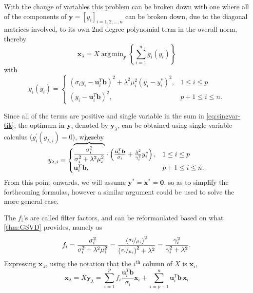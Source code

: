 \documentclass{article}
\newcommand{\mbf}[1]{\mathbf{#1}}
\DeclareMathOperator*{\argmin}{arg\,min} %
\begin{document}
	With the change of variables this problem can be broken down with one where all of the components of $\textbf{y} = \left[y_i\right]_{i=1,2,\dots,n}$ can be broken down, due to the diagonal matrices involved, to its own 2nd degree polynomial term in the overall norm, thereby
	\begin{equation}\label{eq:singvar-tik}
		\textbf{x}_{\lambda} = X \argmin_{\mbf{y}} \left\lbrace \sum_{i=1}^{n} g_i (y_i) \right\rbrace 
	\end{equation}
	with 
	\begin{equation}
		g_i (y_i) = \begin{cases}
			\left(\sigma_i y_i - \textbf{u}_i^T \textbf{b} \right)^2 + \lambda^2 \mu^2_i \left(y_i-y_i^\ast\right)^2, & 1 \leq i \leq p\\
			\left(y_i-\textbf{u}_i^T \textbf{b} \right)^2, & p+1 \leq i \leq n.
		\end{cases}
	\end{equation}
	
	Since all of the terms are positive and single variable in the sum in \autoref{eq:singvar-tik}, the optimum in $\textbf{y}$, denoted by ${\textbf{y}}_\lambda$, can be obtained using single variable calculus ($g_i^\prime({y}_{\lambda, i}) = 0$), whereby
	\vspace{0.2cm}
	\begin{equation}
		{y}_{\lambda,i} = \begin{cases}
			{\smash[t]{\overbrace{\frac{\sigma_i^2}{\sigma_i^2 + \lambda^2 \mu_i^2}}^{f_i := }}}
			\cdot \left(\frac{\textbf{u}_i^T \textbf{b}}{{\normalsize\sigma_i}} + \frac{\lambda^2}{\gamma_i^2}y_i^\ast \right), & 1 \leq i \leq p\\
			\textbf{u}_i^T \textbf{b}, & p+1 \leq i \leq n.
		\end{cases}
	\end{equation}
	From this point onwards, we will assume $\textbf{y}^\ast=\textbf{x}^\ast=\textbf{0}$, so as to simplify the forthcoming formulas, however a similar argument could be used to solve the more general case. 
	
	The $f_i$'s are called filter factors, and can be reformaulated based on what \autoref{thm:GSVD} provides, namely as
	\begin{equation}
		f_i = \frac{\sigma_i^2}{\sigma_i^2 + \lambda^2 \mu_i^2} = \frac{\left(\nicefrac{\sigma_i}{\mu_i}\right)^2}{\left(\nicefrac{\sigma_i}{\mu_i}\right)^2 + \lambda^2}
		= \frac{\gamma_i^2}{\gamma_i^2 + \lambda^2}.
	\end{equation} 
	Expressing $\textbf{x}_\lambda$, using the notation that the $i^{\mathrm{th}}$ column of $X$ is $\textbf{x}_i$, 
	\begin{equation}\label{eq:tik-gsvd-sol}
		\mbf{x}_{\lambda} = X \textbf{y}_\lambda=\sum_{i=1}^pf_i\frac{\mbf{u}_i^T\mbf{b}}{\sigma_i}\mathbf{x}_i+
		\sum_{i=p+1}^n\mbf{u}_i^T\mbf{b}\,\mathbf{x}_i
	\end{equation}
		
\end{document}
